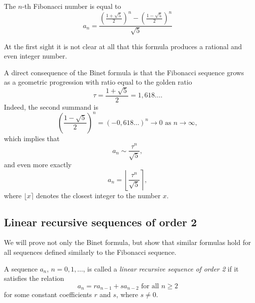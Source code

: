 \begin{page}
\setcounter{section}{1}
\setcounter{subsection}{1}
\setcounter{dfn}{1}
\label{portion:784}

\begin{thm}[Binet]
\label{thm:Binet}
The $n$-th Fibonacci number is equal to
\[
a_n = \frac{\left(\frac{1+\sqrt{5}}2\right)^n - \left(\frac{1-\sqrt{5}}2\right)^n}{\sqrt{5}}
\]
\end{thm}

\end{page}

\begin{page}
\setcounter{section}{1}
\setcounter{subsection}{2}
\setcounter{dfn}{1}
\label{portion:785}


At the first sight it is not clear at all that this formula produces a rational and even integer number.

A direct consequence of the Binet formula is that the Fibonacci sequence grows as a geometric progression with ratio
equal to the golden ratio
\[
\tau = \frac{1+\sqrt{5}}2 = 1,618\ldots.
\]
Indeed, the second summand is
\[
\left(\frac{1-\sqrt{5}}2\right)^n = (-0,618\ldots)^n \to 0 \text{ as } n \to \infty,
\]
which implies that
\[
a_n \sim \frac{\tau^n}{\sqrt{5}},
\]
and even more exactly
\[
a_n = \left\lfloor \frac{\tau^n}{\sqrt{5}} \right\rceil,
\]
where $\lfloor x \rceil$ denotes the closest integer to the number $x$.



\end{page}

\begin{page}
\setcounter{section}{1}
\setcounter{subsection}{2}
\setcounter{dfn}{1}
\label{portion:787}

\subsection{Linear recursive sequences of order 2}
We will prove not only the Binet formula, but show that similar formulas hold for all sequences defined similarly to the Fibonacci sequence.


\end{page}

\begin{page}
\setcounter{section}{1}
\setcounter{subsection}{2}
\setcounter{dfn}{2}
\label{portion:789}

\begin{dfn}
A sequence $a_n$, $n = 0, 1, \ldots$, is called a \emph{linear recursive sequence of order 2} if
it satisfies the relation
\begin{equation}
\label{eqn:LinRec2}
a_n = ra_{n-1} + sa_{n-2} \text{ for all } n \ge 2
\end{equation}
for some constant coefficients $r$ and $s$, where $s \ne 0$.
\end{dfn}

\end{page}

